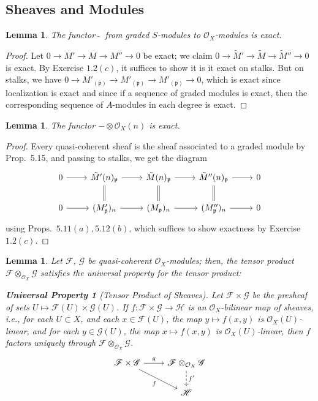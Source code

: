 \documentclass[10pt]{article}
\newtheorem*{universalproperty}{Universal Property}
\newtheorem{lemma}[subsubsection]{Lemma}
\theoremstyle{definition}
\theoremstyle{remark}
\numberwithin{equation}{section}
\numberwithin{figure}{subsubsection}
\newcommand{\FF}{\mathscr{F}}
\newcommand{\GG}{\mathscr{G}}
\newcommand{\HH}{\mathscr{H}}
\newcommand{\OO}{\mathcal{O}}
\begin{document}
\subsection{Sheaves and Modules}
\begin{lemma}\label{tildeexact}
  The functor $\:\tilde{}\:$ from graded $S$-modules to $\OO_X$-modules is exact.
\end{lemma}
\begin{proof}
  Let $0 \to M' \to M \to M'' \to 0$ be exact; we claim $0 \to \tilde{M}' \to
  \tilde{M} \to \tilde{M}'' \to 0$ is exact. By Exercise $1.2(c)$, it suffices to show it is it exact on stalks. But on stalks, we have $0 \to M'_{(\mathfrak{p})} \to M'_{(\mathfrak{p})} \to M'_{(\mathfrak{p})} \to 0$, which is exact since localization is exact \cite[Prop.~3.3]{AM69} and since if a sequence of graded modules is exact, then the corresponding sequence of $A$-modules in each degree is exact.
\end{proof}
\begin{lemma}\label{twistexact}
  The functor $- \otimes \OO_X(n)$ is exact.
\end{lemma}
\begin{proof}
   Every quasi-coherent sheaf is the sheaf associated to a graded module by Prop.~5.15, and passing to stalks, we get the diagram
  \begin{equation*}
    \begin{tikzcd}
      0 \rar & \tilde{M}'(n)_{\mathfrak{p}} \rar\dar[equals] & \tilde{M}(n)_{\mathfrak{p}} \rar\dar[equals] & \tilde{M}''(n)_{\mathfrak{p}} \rar\dar[equals] & 0\\
      0 \rar & (M'_{\mathfrak{p}})_n \rar & (M_{\mathfrak{p}})_n \rar & (M''_{\mathfrak{p}})_n \rar & 0
    \end{tikzcd}
  \end{equation*}
  using Props.~$5.11(a),5.12(b)$, which suffices to show exactness by Exercise $1.2(c)$.
\end{proof}
\begin{lemma}\label{tensorup}
  Let $\FF$, $\GG$ be quasi-coherent $\OO_X$-modules; then, the tensor product $\FF \otimes_{\OO_X} \GG$ satisfies the universal property for the tensor product:
  \begin{universalproperty}[Tensor Product of Sheaves]
    Let $\FF \times \GG$ be the presheaf of sets $U \mapsto \FF(U) \times \GG(U)$. If $f\colon\FF \times \GG \to \HH$ is an $\OO_X$-bilinear map of sheaves, i.e., for each $U \subset X$, and each $x \in \FF(U)$, the map $y \mapsto f(x,y)$ is $\OO_X(U)$-linear, and for each $y \in \GG(U)$, the map $x \mapsto f(x,y)$ is $\OO_X(U)$-linear, then $f$ factors uniquely through $\FF \otimes_{\OO_X} \GG$.
    \begin{equation*}
      \begin{tikzcd}
        \FF \times \GG \rar{g}\arrow{dr}[swap]{f} & \FF \otimes_{\OO_X} \GG\dar[dashed]{f'}\\
        & \HH
      \end{tikzcd}
    \end{equation*}
  \end{universalproperty}
\end{lemma}
\end{document}
